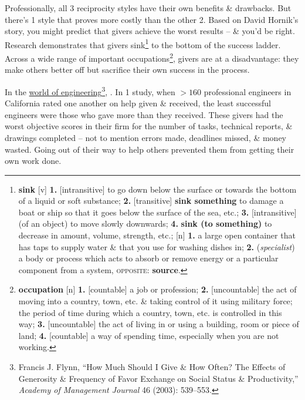 \documentclass[oneside]{book}
\numberwithin{equation}{section}
\begin{document}
Professionally, all 3 reciprocity styles have their own benefits \& drawbacks. But there's 1 style that proves more costly than the other 2. Based on David Hornik's story, you might predict that givers achieve the worst results -- \& you'd be right. Research demonstrates that givers sink\footnote{\textbf{sink} [v] \textbf{1.} [intransitive] to go down below the surface or towards the bottom of a liquid or soft substance; \textbf{2.} [transitive] \textbf{sink something} to damage a boat or ship so that it goes below the surface of the sea, etc.; \textbf{3.} [intransitive] (of an object) to move slowly downwards; \textbf{4.} \textbf{sink (to something)} to decrease in amount, volume, strength, etc.; [n] \textbf{1.} a large open container that has taps to supply water \& that you use for washing dishes in; \textbf{2.} (\textit{specialist}) a body or process which acts to absorb or remove energy or a particular component from a system, \textsc{opposite}: \textbf{source}.} to the bottom of the success ladder. Across a wide range of important occupations\footnote{\textbf{occupation} [n] \textbf{1.} [countable] a job or profession; \textbf{2.} [uncountable] the act of moving into a country, town, etc. \& taking control of it using military force; the period of time during which a country, town, etc. is controlled in this way; \textbf{3.} [uncountable] the act of living in or using a building, room or piece of land; \textbf{4.} [countable] a way of spending time, especially when you are not working.}, givers are at a disadvantage: they make others better off but sacrifice their own success in the process.

In the \underline{world of engineering}\footnote{Francis J. Flynn, ``How Much Should I Give \& How Often? The Effects of Generosity \& Frequency of Favor Exchange on Social Status \& Productivity,'' \textit{Academy of Management Journal} 46 (2003): 539--553.}, . In 1 study, when $> 160$ professional engineers in California rated one another on help given \& received, the least successful engineers were those who gave more than they received. These givers had the worst objective scores in their firm for the number of tasks, technical reports, \& drawings completed -- not to mention errors made, deadlines missed, \& money wasted. Going out of their way to help others prevented them from getting their own work done.
\end{document}
